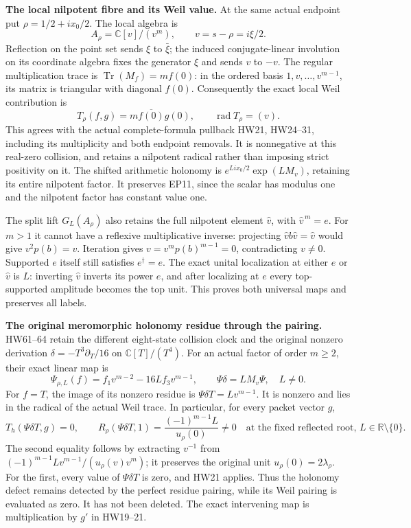 \documentclass[11pt,a4paper]{article}
\theoremstyle{definition}\newtheorem{definition}[theorem]{Definition}
\begin{document}
\EP\textbf{The local nilpotent fibre and its Weil value.}
At the same actual endpoint put $\rho=1/2+ix_0/2$.
The local algebra is
\[
 A_\rho=\mathbb C[v]/(v^m),\qquad v=s-\rho=i\xi/2.
 \tag{EP10}\label{ep:jet}
\]
Reflection on the point set sends $\xi$ to $\bar\xi$; the induced
conjugate-linear involution on its coordinate algebra fixes the
generator $\xi$ and sends $v$ to $-v$.
The regular multiplication trace is
$\operatorname{Tr}(M_f)=m f(0)$: in the ordered basis
$1,v,\ldots,v^{m-1}$, its matrix is triangular with diagonal
$f(0)$. Consequently the exact local Weil contribution is
\[
 T_\rho(f,g)=m\overline{f(0)}g(0),\qquad
 \operatorname{rad}T_\rho=(v).
 \tag{EP11}\label{ep:trace}
\]
This agrees with the actual complete-formula pullback HW21,
HW24--31, including its multiplicity and both endpoint removals.
It is nonnegative at this real-zero collision, and retains a
nilpotent radical rather than imposing strict positivity on it.
The shifted arithmetic holonomy is
$e^{Li x_0/2}\exp(LM_v)$, retaining its entire nilpotent factor.
It preserves EP11, since the scalar has modulus one and the
nilpotent factor has constant value one.

The split lift $G_L(A_\rho)$ also retains the full nilpotent element
$\widehat v$, with $\widehat v^{\,m}=e$. For $m>1$ it cannot have
a reflexive multiplicative inverse: projecting
$\widehat v b\widehat v=\widehat v$ would give $v^2p(b)=v$.
Iteration gives $v=v^m p(b)^{m-1}=0$, contradicting $v\ne0$.
Supported $e$ itself still satisfies $e^\dagger=e$.
The exact unital localization at either $e$ or $\widehat v$
is $L$: inverting $\widehat v$ inverts its power $e$, and after
localizing at $e$ every top-supported amplitude becomes the top
unit. This proves both universal maps and preserves all labels.

\EP\textbf{The original meromorphic holonomy residue through the pairing.}
HW61--64 retain the different eight-state collision clock and the
original nonzero derivation
$\delta=-T^3\partial_T/16$ on $\mathbb C[T]/(T^4)$.
For an actual factor of order $m\ge2$, their exact linear map is
\[
 \Psi_{\rho,L}(f)=f_1v^{m-2}-16Lf_3v^{m-1},\qquad
 \Psi\delta=L M_v\Psi,\quad L\ne0.
 \tag{EP12}
\]
For $f=T$, the image of its nonzero residue is
$\Psi\delta T=Lv^{m-1}$. It is nonzero and lies in the radical
of the actual Weil trace. In particular, for every packet vector $g$,
\[
 T_h(\Psi\delta T,g)=0,
 \qquad
 R_\rho(\Psi\delta T,1)
       =\frac{(-1)^{m-1}L}{u_\rho(0)}\ne0
       \quad\text{at the fixed reflected root, }L\in\mathbb R\setminus\{0\}.
 \tag{EP13}
\]
The second equality follows by extracting $v^{-1}$ from
$(-1)^{m-1}Lv^{m-1}/(u_\rho(v)v^m)$; it preserves the original
unit $u_\rho(0)=2\lambda_\rho$. For the first, every value
of $\Psi\delta T$ is zero, and HW21 applies. Thus the holonomy
defect remains detected by the perfect residue pairing, while its
Weil pairing is evaluated as zero. It has not been deleted.
The exact intervening map is multiplication by $g'$ in HW19--21.
\end{document}
